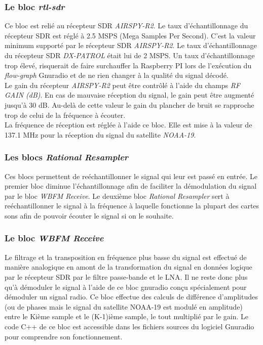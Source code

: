 \documentclass[12pt,fleqn]{book} %
\begin{document}
\subsubsection{Le bloc \emph{rtl-sdr}}
\noindent Ce bloc est relié au récepteur SDR \emph{AIRSPY-R2}. Le taux d'échantillonnage du récepteur SDR est réglé à 2.5 MSPS (Mega Samples Per Second). C'est la valeur minimum supporté par le récepteur SDR \emph{AIRSPY-R2}. Le taux d'échantillonnage du récepteur SDR \emph{DX-PATROL} était lui de 2 MSPS. Un taux d'échantillonnage trop élevé, risquerait de faire surchauffer la Raspberry PI lors de l'exécution du \emph{flow-graph} Gnuradio et de ne rien changer à la qualité du signal décodé.
~\\Le gain du récepteur \emph{AIRSPY-R2} peut être contrôlé à l'aide du champs \emph{RF GAIN (dB)}. En cas de mauvaise réception du signal, le gain peut être augmenté jusqu'à 30 dB. Au-delà de cette valeur le gain du plancher de bruit se rapproche trop de celui de la fréquence à écouter.
~\\La fréquence de réception est réglée à l'aide ce bloc. Elle est mise à la valeur de 137.1 MHz pour la réception du signal du satellite \emph{NOAA-19}.
\subsubsection{Les blocs \emph{Rational Resampler}}
\noindent Ces blocs permettent de reéchantillonner le signal qui leur est passé en entrée. Le premier bloc diminue l'échantillonnage afin de faciliter la démodulation du signal par le bloc \emph{WBFM Receive}.
Le deuxième bloc \emph{Rational Resampler} sert à reéchantillonner le signal à la fréquence à laquelle fonctionne la plupart des cartes sons afin de pouvoir écouter le signal si on le souhaite.
\subsubsection{Le bloc \emph{WBFM Receive}}
\noindent Le filtrage et la transposition en fréquence plus basse du signal est effectué de manière analogique en amont de la transformation du signal en données logique par le récepteur SDR par le filtre passe-bande et le LNA. Il ne reste donc plus qu'à démoduler le signal à l'aide de ce bloc gnuradio conçu spécialement pour démoduler un signal radio. Ce bloc effectue des calculs de différence d'amplitudes (ou de phases mais le signal du satellite NOAA-19 est modulé en amplitude) entre le Kième sample et le (K-1)ième sample, le tout multiplié par le gain. Le code C++ de ce bloc est accessible dans les fichiers sources du logiciel Gnuradio pour comprendre son fonctionnement.
\end{document}
